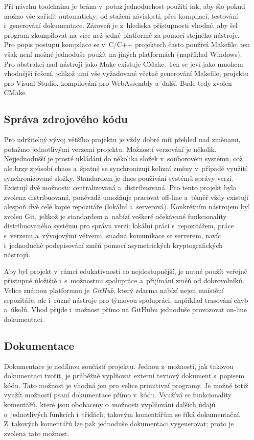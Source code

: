 Při návrhu toolchainu je brána v~potaz jednoduchost použití tak, aby šlo pokud možno vše zařídit automaticky: od stažení závislostí, přes kompilaci, testování i~generování dokumentace. Zároveň je z~hlediska přístupnosti vhodné, aby šel program zkompilovat na více než jedné platformě za pomocí stejného nástroje. Pro popis postupu kompilace se v~C/C++ projektech často používá Makefile; ten však není možné jednoduše použít na jiných platformách (například Windows). Pro abstrakci nad nástroji jako Make existuje CMake. Ten se jeví jako mnohem vhodnější řešení, jelikož umí vše vyžadované včetně generování Makefile, projektu pro Visual Studio, kompilování pro WebAssembly a~další. Bude tedy zvolen CMake.

\subsection{Správa zdrojového kódu}
Pro udržitelný vývoj většího projektu je vždy dobré mít přehled nad změnami, potažmo jednotlivými verzemi projektu. Možností verzování je několik. Nejjednodušší je prosté ukládání do několika složek v~souborovém systému, což ale brzy způsobí chaos a~špatně se synchronizují kolizní změny v~případě využití synchronizované složky. Standardem je dnes používání systémů správy verzí. Existují dvě možnosti: centralizovaná a~distribuovaná. Pro tento projekt byla zvolena distribuovaná, poněvadž umožňuje pracovat off-line a~téměř vždy existují alespoň dvě celé kopie repozitáře (lokální a~serverová). Konkrétním nástrojem byl zvolen Git, jelikož je standardem a~nabízí veškeré očekávané funkcionality distribuovaného systému pro správu verzí: lokální práci s~repozitářem, práce s~verzemi a~vývojovými větvemi, snadná komunikace se serverem, navíc i~jednoduché podepisování změň pomocí asymetrických kryptografických nástrojů.

Aby byl projekt v~rámci edukativnosti co nejdostupnější, je nutné použít veřejně přístupné úložiště i~s~možnostmi spolupráce a~přijímání změň od dobrovolníků. Velice známou platformou je \emph{GitHub}, který zdarma nabízí nejen umístění repozitáře, ale i~různé nástroje pro týmovou spolupráci, například trasování chyb a~úkolů. Vhod přijde i~možnost přímo na GitHubu jednoduše provozovat on-line dokumentaci.

\subsection{Dokumentace}
Dokumentace je nedílnou součástí projektu. Jednou z~možností, jak takovou dokumentaci tvořit, je průběžně vyplňovat externí textový dokument s~popisem kódu. Tato možnost je vhodná jen pro velice primitivní programy. Je možné totiž využít možností psaní dokumentace přímo v~kódu. Využívá se funkcionality komentářů, které jsou obohaceny o~možnosti vyplňování dalších údajů o~jednotlivých funkcích i~třídách; takovým komentářům se říká dokumentační. Z~takových komentářů lze pak jednoduše dokumentaci vygenerovat; proto je zvolena tato možnost.

